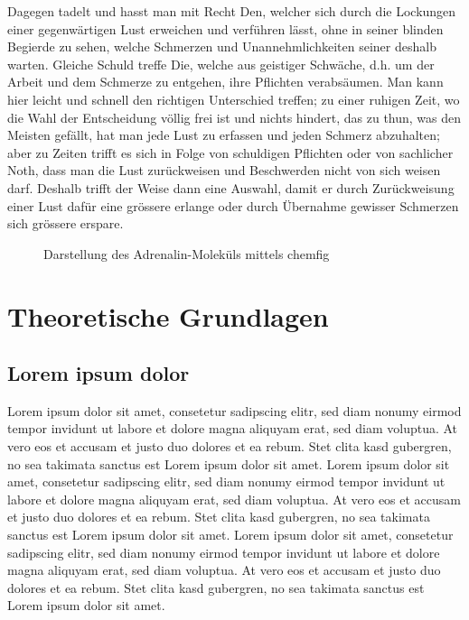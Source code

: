 \documentclass[ %
	DIV=15,
	BCOR=14mm, %
	parskip=half, %
	headsepline, %
	cleardoublepage=empty, %
	tablecaptionabove, %
	toc=bib, %
	toc=listofnumbered, %
	listof=leveldown, %
	numbers=noendperiod %
	]{scrbook}
\begin{document}
Dagegen tadelt und hasst man mit Recht Den, welcher sich durch die Lockungen einer gegenwärtigen Lust erweichen und verführen lässt, ohne in seiner blinden Begierde zu sehen, welche Schmerzen und Unannehmlichkeiten seiner deshalb warten. Gleiche Schuld treffe Die, welche aus geistiger Schwäche, d.h. um der Arbeit und dem Schmerze zu entgehen, ihre Pflichten verabsäumen. Man kann hier leicht und schnell den richtigen Unterschied treffen; zu einer ruhigen Zeit, wo die Wahl der Entscheidung völlig frei ist und nichts hindert, das zu thun, was den Meisten gefällt, hat man jede Lust zu erfassen und jeden Schmerz abzuhalten; aber zu Zeiten trifft es sich in Folge von schuldigen Pflichten oder von sachlicher Noth, dass man die Lust zurückweisen und Beschwerden nicht von sich weisen darf. Deshalb trifft der Weise dann eine Auswahl, damit er durch Zurückweisung einer Lust dafür eine grössere erlange oder durch Übernahme gewisser Schmerzen sich grössere erspare.



\begin{figure}[htbp]
\begin{center}
	\caption{Darstellung des Adrenalin-Moleküls mittels chemfig}
\end{center}
\end{figure}


\chapter{Theoretische Grundlagen} %
\label{cha:theoretische_grundlagen}

\section{Lorem ipsum dolor} %
\label{sec:lorem_ipsum_dolor}

Lorem ipsum dolor sit amet, consetetur sadipscing elitr, sed diam nonumy eirmod tempor invidunt ut labore et dolore magna aliquyam erat, sed diam voluptua. At vero eos et accusam et justo duo dolores et ea rebum. Stet clita kasd gubergren, no sea takimata sanctus est Lorem ipsum dolor sit amet. Lorem ipsum dolor sit amet, consetetur sadipscing elitr, sed diam nonumy eirmod tempor invidunt ut labore et dolore magna aliquyam erat, sed diam voluptua. At vero eos et accusam et justo duo dolores et ea rebum. Stet clita kasd gubergren, no sea takimata sanctus est Lorem ipsum dolor sit amet. Lorem ipsum dolor sit amet, consetetur sadipscing elitr, sed diam nonumy eirmod tempor invidunt ut labore et dolore magna aliquyam erat, sed diam voluptua. At vero eos et accusam et justo duo dolores et ea rebum. Stet clita kasd gubergren, no sea takimata sanctus est Lorem ipsum dolor sit amet.
\end{document}
